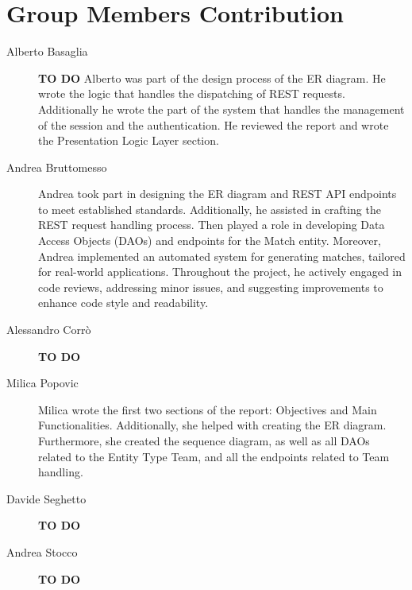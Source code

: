 \section{Group Members Contribution}


\begin{description}
	\item[Alberto Basaglia] \textbf{TO DO}
Alberto was part of the design process of the ER diagram.
He wrote the logic that handles the dispatching of REST requests.
Additionally he wrote the part of the system that handles the management of the session and the authentication.
He reviewed the report and wrote the Presentation Logic Layer section.
	\item[Andrea Bruttomesso]
Andrea took part in designing the ER diagram and REST API endpoints to meet established standards.
Additionally, he assisted in crafting the REST request handling process.
Then played a role in developing Data Access Objects (DAOs) and endpoints for the Match entity. Moreover, Andrea implemented an automated system for generating matches, tailored for real-world applications.
Throughout the project, he actively engaged in code reviews, addressing minor issues, and suggesting improvements to enhance code style and readability.
	\item[Alessandro Corrò] \textbf{TO DO}
	\item[Milica Popovic]
Milica wrote the first two sections of the report: Objectives and Main Functionalities.
Additionally, she helped with creating the ER diagram.
Furthermore, she created the sequence diagram, as well as all DAOs related to the Entity Type Team, and all the endpoints related to Team handling.
	\item[Davide Seghetto] \textbf{TO DO}
	\item[Andrea Stocco] \textbf{TO DO}
\end{description}
